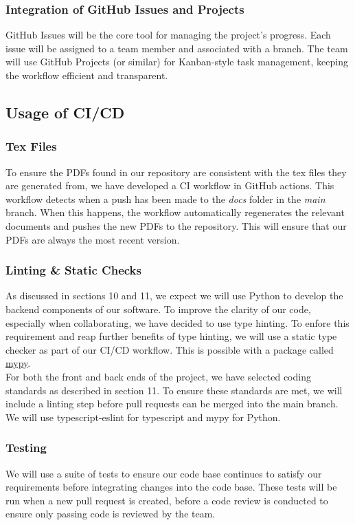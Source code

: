 \documentclass{article}
\begin{document}
\subsubsection{Integration of GitHub Issues and Projects} 
GitHub Issues will be the core tool for managing the project’s progress. Each issue will be assigned to a team member and associated with a branch. The team will use GitHub Projects (or similar) for Kanban-style task management, keeping the workflow efficient and transparent.

\subsection{Usage of CI/CD}

\subsubsection{Tex Files}
To ensure the PDFs found in our repository are consistent with the tex files they are generated from, we have developed a CI workflow in GitHub actions.
 This workflow detects when a push has been made to the \textit{docs} folder in the \textit{main} branch. When this happens, the workflow automatically regenerates
 the relevant documents and pushes the new PDFs to the repository. This will ensure that our PDFs are always the most recent version.

\subsubsection{Linting \& Static Checks}
As discussed in sections 10 and 11, we expect we will use Python to develop the backend components of our software. To improve the clarity of our code, especially
when collaborating, we have decided to use type hinting. To enfore this requirement and reap further benefits of type hinting, we will use a static
type checker as part of our CI/CD workflow. This is possible with a package called 
 \href{https://mypy-lang.org/}{mypy}.\\

 For both the front and back ends of the project, we have selected coding standards as described in section 11. To ensure these standards are met, we will include
 a linting step before pull requests can be merged into the main branch. We will use typescript-eslint for typescript and mypy for Python.

\subsubsection{Testing}
We will use a suite of tests to ensure our code base continues to satisfy our requirements before integrating changes into the code base. These tests
will be run when a new pull request is created, before a code review is conducted to ensure only passing code is reviewed by the team.
\end{document}
